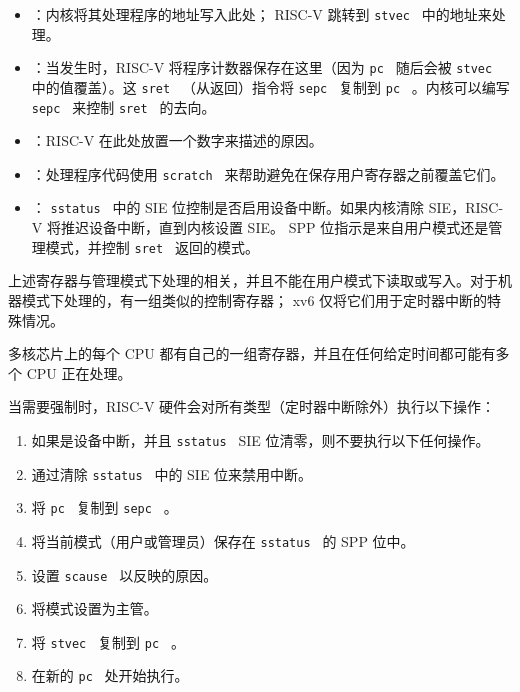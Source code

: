    \begin{itemize}


   \item      {}    ：内核将其处理程序的地址写入此处； RISC-V 跳转到  {    \tt    stvec   }  中的地址来处理。   \item      {}    ：当发生时，RISC-V 将程序计数器保存在这里（因为  {    \tt    pc   }  随后会被  {    \tt    stvec   }  中的值覆盖）。这
  {    \tt    sret   } （从返回）指令将  {    \tt    sepc   }  复制到
  {    \tt    pc   }  。内核可以编写  {    \tt    sepc   }  来控制  {    \tt    sret   }  的去向。   \item      {}   ：RISC-V 在此处放置一个数字来描述的原因。   \item      {}    ：处理程序代码使用  {    \tt    scratch   }  来帮助避免在保存用户寄存器之前覆盖它们。   \item      {}   ： {    \tt    sstatus   }  中的 SIE 位控制是否启用设备中断。如果内核清除 SIE，RISC-V 将推迟设备中断，直到内核设置 SIE。 SPP 位指示是来自用户模式还是管理模式，并控制  {    \tt    sret   }  返回的模式。  \end{itemize}     

上述寄存器与管理模式下处理的相关，并且不能在用户模式下读取或写入。对于机器模式下处理的，有一组类似的控制寄存器； xv6 仅将它们用于定时器中断的特殊情况。  

多核芯片上的每个 CPU 都有自己的一组寄存器，并且在任何给定时间都可能有多个 CPU 正在处理。  

当需要强制时，RISC-V 硬件会对所有类型（定时器中断除外）执行以下操作：  

   \begin{enumerate}


   \item   如果是设备中断，并且  {    \tt    sstatus   }  SIE 位清零，则不要执行以下任何操作。   \item   通过清除  {    \tt    sstatus   }  中的 SIE 位来禁用中断。   \item   将  {    \tt    pc   }  复制到  {    \tt    sepc   }  。   \item   将当前模式（用户或管理员）保存在  {    \tt    sstatus   }  的 SPP 位中。   \item   设置  {    \tt   scause   }  以反映的原因。   \item   将模式设置为主管。   \item   将  {    \tt    stvec   }  复制到  {    \tt    pc   }  。   \item   在新的  {    \tt    pc   }  处开始执行。  \end{enumerate}     

